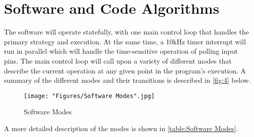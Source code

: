 \documentclass[11pt, oneside]{article} %
\begin{document}

\section{Software and Code Algorithms}	
The software will operate statefully, with one main control loop that handles the primary strategy and execution. At the same time, a 10kHz timer interrupt will run in parallel which will handle the time-sensitive operation of polling input pins.
The main control loop will call upon a variety of different modes that describe the current operation at any given point in the program's execution. A summary of the different modes and their transitions is described in \autoref{fig:4} below.

\begin{figure}[h]
	\centering
	\texttt{[image: "Figures/Software Modes".jpg]}
	\caption[Software Modes]{Software Modes}
	\label{fig:4}
\end{figure}

A more detailed description of the modes is shown in \autoref{table:Software Modes}.
\end{document}
